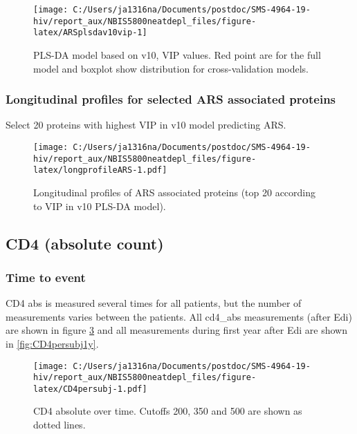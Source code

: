 \documentclass[
]{article}
\begin{document}
\begin{figure}
\texttt{[image: C:/Users/ja1316na/Documents/postdoc/SMS-4964-19-hiv/report\_aux/NBIS5800neatdepl\_files/figure-latex/ARSplsdav10vip-1]} \caption{PLS-DA model based on v10, VIP values. Red point are for the full model and boxplot show distribution for cross-validation models.}\label{fig:ARSplsdav10vip}
\end{figure}

\FloatBarrier

\hypertarget{longitudinal-profiles-for-selected-ars-associated-proteins}{%
\subsubsection{Longitudinal profiles for selected ARS associated proteins}\label{longitudinal-profiles-for-selected-ars-associated-proteins}}

Select 20 proteins with highest VIP in v10 model predicting ARS.

\begin{figure}
\centering
\texttt{[image: C:/Users/ja1316na/Documents/postdoc/SMS-4964-19-hiv/report\_aux/NBIS5800neatdepl\_files/figure-latex/longprofileARS-1.pdf]}
\caption{\label{fig:longprofileARS}Longitudinal profiles of ARS associated proteins (top 20 according to VIP in v10 PLS-DA model).}
\end{figure}

\FloatBarrier

\hypertarget{cd4-absolute-count}{%
\subsection{CD4 (absolute count)}\label{cd4-absolute-count}}

\hypertarget{time-to-event}{%
\subsubsection{Time to event}\label{time-to-event}}

CD4 abs is measured several times for all patients, but the number of measurements varies between the patients. All cd4\_abs measurements (after Edi) are shown in figure \ref{fig:CD4persubj} and all measurements during first year after Edi are shown in \ref{fig:CD4persubj1y}.

\begin{figure}
\centering
\texttt{[image: C:/Users/ja1316na/Documents/postdoc/SMS-4964-19-hiv/report\_aux/NBIS5800neatdepl\_files/figure-latex/CD4persubj-1.pdf]}
\caption{\label{fig:CD4persubj}CD4 absolute over time. Cutoffs 200, 350 and 500 are shown as dotted lines.}
\end{figure}
\end{document}
